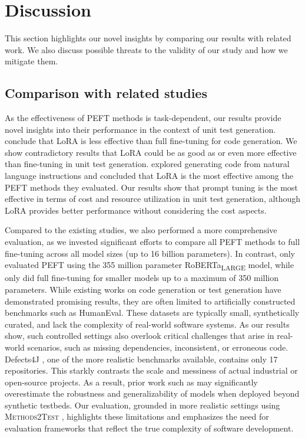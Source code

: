 \documentclass[12pt]{book}
\begin{document}
\section{Discussion}
\label{chap:discussion}
This section highlights our novel insights by comparing our results with related work. We also discuss possible threats to the validity of our study and how we mitigate them. 

\subsection{Comparison with related studies}
As the effectiveness of PEFT methods is task-dependent, our results provide novel insights into their performance in the context of unit test generation.  \citet{Ayupov2022ParameterEfficientFO} conclude that LoRA is less effective than full fine-tuning for code generation. We show contradictory results that LoRA could be as good as or even more effective than fine-tuning in unit test generation. \citet{weyssow2024exploring} explored generating code from natural language instructions and concluded that LoRA is the most effective among the PEFT methods they evaluated. Our results show that prompt tuning is the most effective in terms of cost and resource utilization in unit test generation, although LoRA provides better performance without considering the cost aspects. 

Compared to the existing studies, we also performed a more comprehensive evaluation, as we invested significant efforts to compare all PEFT methods to full fine-tuning across all model sizes (up to 16 billion parameters). In contrast, \citet{Ding2023ParameterefficientFO} only evaluated PEFT using the 355 million parameter RoBERTa\textsubscript{LARGE} model, while \citet{weyssow2024exploring} only did full fine-tuning for smaller models up to a maximum of 350 million parameters. While existing works on code generation or test generation have demonstrated promising results, they are often limited to artificially constructed benchmarks such as HumanEval. These datasets are typically small, synthetically curated, and lack the complexity of real-world software systems. As our results show, such controlled settings also overlook critical challenges that arise in real-world scenarios, such as missing dependencies, inconsistent, or erroneous code. Defects4J \citep{just2014defects4j}, one of the more realistic benchmarks available, contains only 17 repositories. This starkly contrasts the scale and messiness of actual industrial or open-source projects. As a result, prior work such as \citet{alagarsamy2024a3test} may significantly overestimate the robustness and generalizability of models when deployed beyond synthetic testbeds. Our evaluation, grounded in more realistic settings using \textsc{Methods2Test} \citep{tufano2021unit}, highlights these limitations and emphasizes the need for evaluation frameworks that reflect the true complexity of software development.
\end{document}
